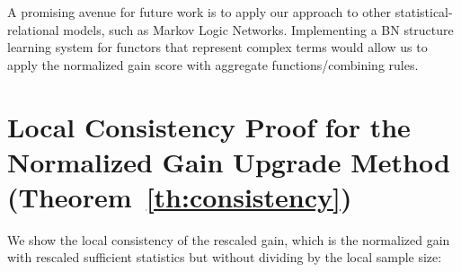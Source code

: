 \documentclass{article}
\begin{document}
A promising avenue for future work is to apply our approach to other statistical-relational models, such as Markov Logic Networks.
Implementing a BN structure learning system for functors that represent complex terms  would allow us to apply the normalized gain score with aggregate functions/combining rules. 



\appendix
\section{Local Consistency Proof for the Normalized Gain Upgrade Method (Theorem~\ref{th:consistency})} \label{sec:proof}

We show the local consistency of the rescaled gain, which is the normalized gain with rescaled sufficient statistics but without dividing by the local sample size:
\end{document}
